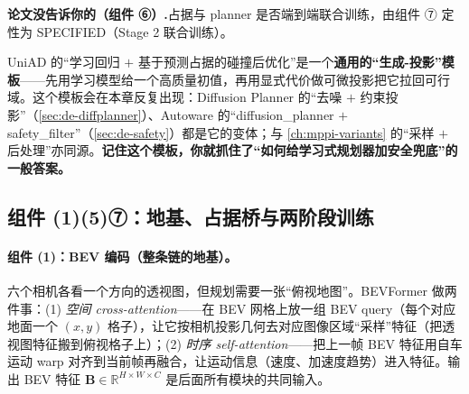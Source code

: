 
\begin{note}
\textbf{论文没告诉你的（组件 ⑥）.}\;占据与 planner 是否端到端联合训练，由组件 ⑦ 定性为 SPECIFIED（Stage 2 联合训练）。
\end{note}

\begin{insight}
UniAD 的“学习回归 $+$ 基于预测占据的碰撞后优化”是一个\textbf{通用的“生成-投影”模板}——先用学习模型给一个高质量初值，再用显式代价做可微投影把它拉回可行域。这个模板会在本章反复出现：Diffusion Planner 的“去噪 $+$ 约束投影”（\cref{sec:de-diffplanner}）、Autoware 的“diffusion\_planner $+$ safety\_filter”（\cref{sec:de-safety}）都是它的变体；与 \cref{ch:mppi-variants} 的“采样 $+$ 后处理”亦同源。\textbf{记住这个模板，你就抓住了“如何给学习式规划器加安全兜底”的一般答案。}
\end{insight}

\subsection{组件 (1)(5)⑦：地基、占据桥与两阶段训练}
\label{sec:de-uniad-rest}

\paragraph{组件 (1)：BEV 编码（整条链的地基）。}
六个相机各看一个方向的透视图，但规划需要一张“俯视地图”。BEVFormer 做两件事：(1) \emph{空间 cross-attention}——在 BEV 网格上放一组 BEV query（每个对应地面一个 $(x,y)$ 格子），让它按相机投影几何去对应图像区域“采样”特征（把透视图特征搬到俯视格子上）；(2) \emph{时序 self-attention}——把上一帧 BEV 特征用自车运动 warp 对齐到当前帧再融合，让运动信息（速度、加速度趋势）进入特征。输出 BEV 特征 $\mathbf{B}\in\mathbb{R}^{H\times W\times C}$ 是后面所有模块的共同输入。

